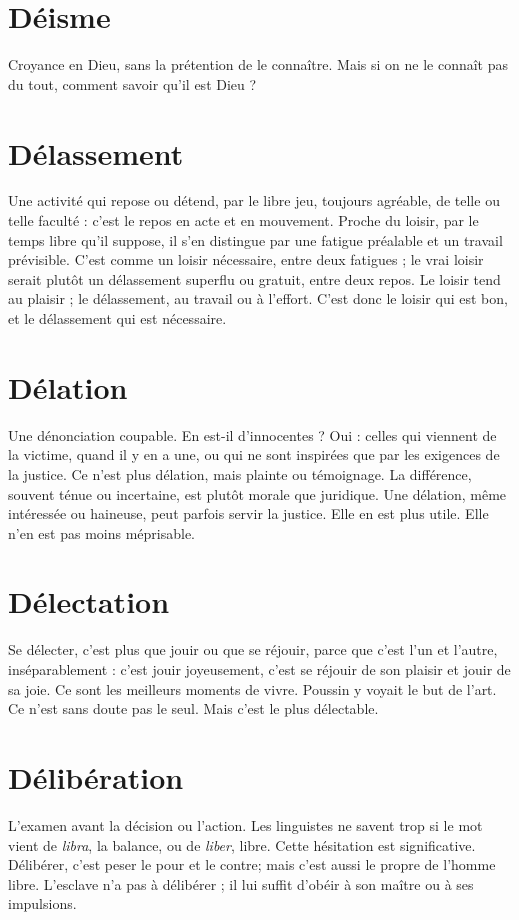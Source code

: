 \section{Déisme}
Croyance en Dieu, sans la prétention de le connaître. Mais si on
ne le connaît pas du tout, comment savoir qu’il est Dieu ?

\section{Délassement}
Une activité qui repose ou détend, par le libre jeu, toujours
agréable, de telle ou telle faculté : c’est le repos en
acte et en mouvement. Proche du loisir, par le temps libre qu’il suppose, il s’en
distingue par une fatigue préalable et un travail prévisible. C’est comme un
loisir nécessaire, entre deux fatigues ; le vrai loisir serait plutôt un délassement
superflu ou gratuit, entre deux repos. Le loisir tend au plaisir ; le délassement,
au travail ou à l’effort. C’est donc le loisir qui est bon, et le délassement qui est
nécessaire.

\section{Délation}
Une dénonciation coupable. En est-il d’innocentes ? Oui : celles
qui viennent de la victime, quand il y en a une, ou qui ne sont
inspirées que par les exigences de la justice. Ce n’est plus délation, mais plainte
ou témoignage. La différence, souvent ténue ou incertaine, est plutôt morale
que juridique. Une délation, même intéressée ou haineuse, peut parfois servir
la justice. Elle en est plus utile. Elle n’en est pas moins méprisable.

\section{Délectation}
Se délecter, c’est plus que jouir ou que se réjouir, parce
que c’est l’un et l’autre, inséparablement : c’est jouir
joyeusement, c’est se réjouir de son plaisir et jouir de sa joie. Ce sont les
meilleurs moments de vivre. Poussin y voyait le but de l’art. Ce n’est sans doute
pas le seul. Mais c’est le plus délectable.

\section{Délibération}
L'examen avant la décision ou l’action. Les linguistes ne
savent trop si le mot vient de {\it libra}, la balance, ou de
{\it liber}, libre. Cette hésitation est significative. Délibérer, c’est peser le pour et le
contre; mais c'est aussi le propre de l’homme libre. L’esclave n’a pas à
délibérer ; il lui suffit d’obéir à son maître ou à ses impulsions.

